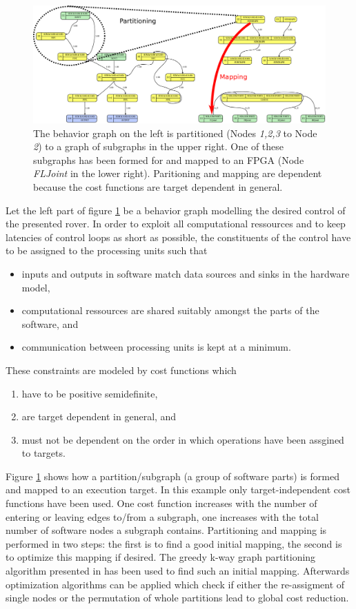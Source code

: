 \documentclass[a4paper,twocolumn]{esapub2005} %
\begin{document}
\begin{figure}[t]
    \centering
    \includegraphics[width=.45\textwidth]{pics/PartAndMap.png}
    \caption{
        The behavior graph on the left is partitioned (Nodes \emph{1,2,3} to
        Node \emph{2}) to a graph of subgraphs in the upper right.
        One of these subgraphs has been formed for and mapped to an FPGA (Node \emph{FLJoint} in the lower right).
        Paritioning and mapping are dependent because the cost functions are target dependent in general.
    }
    \label{fig:PartAndMap}
\end{figure}
Let the left part of figure \ref{fig:PartAndMap} be a behavior graph modelling the desired control of the presented rover.
In order to exploit all computational ressources and to keep latencies of control loops as short as possible,
the constituents of the control have to be assigned to the processing units such that
\begin{itemize}
    \item inputs and outputs in software match data sources and sinks in the hardware model,
    \item computational ressources are shared suitably amongst the parts of the software, and
    \item communication between processing units is kept at a minimum.
\end{itemize}
These constraints are modeled by cost functions which
\begin{enumerate}
    \item have to be positive semidefinite,
    \item are target dependent in general, and
    \item must not be dependent on the order in which operations have been assgined to targets.
\end{enumerate}
Figure \ref{fig:PartAndMap} shows how a partition/subgraph (a group of software parts) is formed and mapped to an execution target.
In this example only target-independent cost functions have been used.
One cost function increases with the number of entering or leaving edges to/from a subgraph,
one increases with the total number of software nodes a subgraph contains.
Partitioning and mapping is performed in two steps:
the first is to find a good initial mapping, the second is to optimize this mapping if desired.
The greedy k-way graph partitioning algorithm presented in \cite{2000_Jain} has been used to find such an initial mapping.
Afterwards optimization algorithms can be applied which check if either the re-assigment of single nodes or the permutation of whole partitions lead to global cost reduction.
\end{document}
